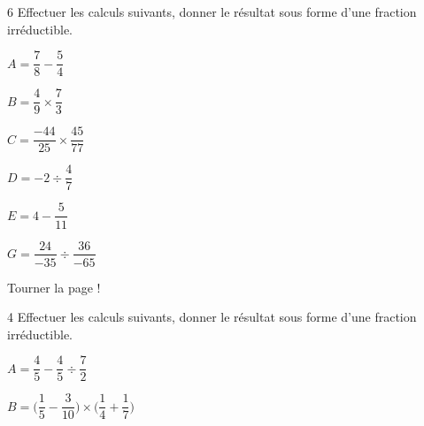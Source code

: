 \documentclass[a4paper]{book}
\begin{document}
{    \begin{exerciceNote}{6}
        Effectuer les calculs suivants, donner le résultat sous forme d'une fraction irréductible.

        \begin{minipage}{0.24\linewidth}
            $A = \dfrac{7}{8} - \dfrac{5}{4}$
            \vspace{4cm}
        \end{minipage}
        \hfill\vline\hfill
        \begin{minipage}{0.24\linewidth}
            $B = \dfrac{4}{9}\times\dfrac{7}{3}$
            \vspace{4cm}
        \end{minipage}        
        \hfill\vline\hfill
        \begin{minipage}{0.24\linewidth}
            $C = \dfrac{-44}{25} \times \dfrac{45}{77}$
            \vspace{4cm}
        \end{minipage}
        \hfill\vline\hfill
        \begin{minipage}{0.24\linewidth}
            $D = -2 \div \dfrac{4}{7}$
            \vspace{4cm}
        \end{minipage}

        \vspace{1cm}

        \begin{minipage}{0.45\linewidth}
            $E = 4 - \dfrac{5}{11}$
            \vspace{4cm}
        \end{minipage}
        \hfill\vline\hfill
        \begin{minipage}{0.45\linewidth}
            $G = \dfrac{24}{-35}\div\dfrac{36}{-65}$
            \vspace{4cm}
        \end{minipage}        
    \end{exerciceNote}

\vfill
\hfill Tourner la page !


\newpage


    \begin{exerciceNote}{4}
        Effectuer les calculs suivants, donner le résultat sous forme d'une fraction irréductible.

        \begin{minipage}{0.45\linewidth}
            $A = \dfrac{4}{5}-\dfrac{4}{5}\div\dfrac{7}{2}$
            \vspace{4cm}
        \end{minipage}
        \hfill\vline\hfill
        \begin{minipage}{0.45\linewidth}
            $B = \bigg(\dfrac{1}{5}-\dfrac{3}{10}\bigg)\times\bigg(\dfrac{1}{4}+\dfrac{1}{7}\bigg)$
            \vspace{4cm}
        \end{minipage}   
    \end{exerciceNote}


}
\end{document}
